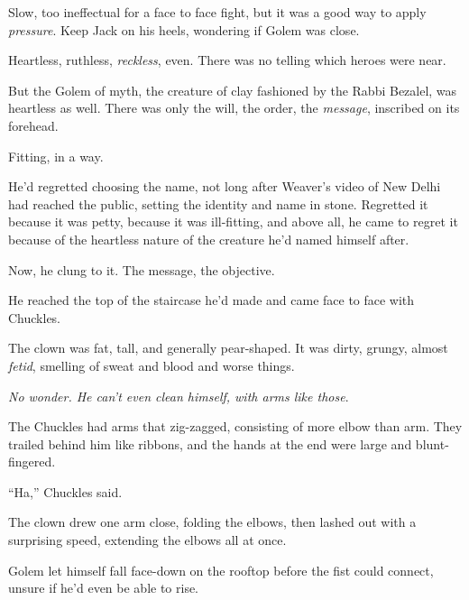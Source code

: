 Slow, too ineffectual for a face to face fight, but it was a good way to apply \emph{pressure}.  Keep Jack on his heels, wondering if Golem was close.



Heartless, ruthless, \emph{reckless}, even.  There was no telling which heroes were near.



But the Golem of myth, the creature of clay fashioned by the Rabbi Bezalel, was heartless as well.  There was only the will, the order, the \emph{message}, inscribed on its forehead.



Fitting, in a way.



He'd regretted choosing the name, not long after Weaver's video of New Delhi had reached the public, setting the identity and name in stone.  Regretted it because it was petty, because it was ill-fitting, and above all, he came to regret it because of the heartless nature of the creature he'd named himself after.



Now, he clung to it.  The message, the objective.



He reached the top of the staircase he'd made and came face to face with Chuckles.



The clown was fat, tall, and generally pear-shaped.  It was dirty, grungy, almost \emph{fetid}, smelling of sweat and blood and worse things.



\emph{No wonder.  He can't even clean himself, with arms like those}.



The Chuckles had arms that zig-zagged, consisting of more elbow than arm.  They trailed behind him like ribbons, and the hands at the end were large and blunt-fingered.



``Ha,'' Chuckles said.



The clown drew one arm close, folding the elbows, then lashed out with a surprising speed, extending the elbows all at once.



Golem let himself fall face-down on the rooftop before the fist could connect, unsure if he'd even be able to rise.




